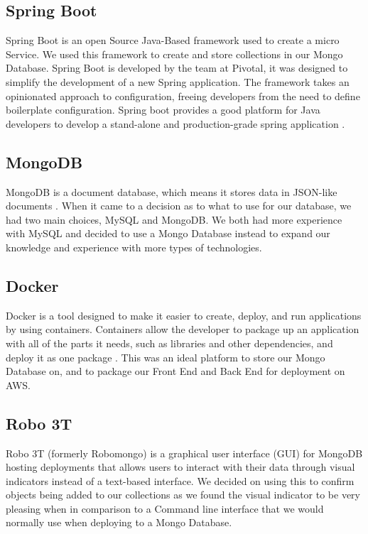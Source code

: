 \subsection{Spring Boot}
Spring Boot is an open Source Java-Based framework used to create a micro Service. We used this framework to create and store collections in our Mongo Database. Spring Boot is developed by the team at Pivotal, it was designed to simplify the development of a new Spring application. The framework takes an opinionated approach to configuration, freeing developers from the need to define boilerplate configuration. Spring boot provides a good platform for Java developers to develop a stand-alone and production-grade spring application \cite{Javapoint}.

\subsection{MongoDB}
MongoDB is a document database, which means it stores data in JSON-like documents \cite{Mongo}. When it came to a decision as to what to use for our database, we had two main choices, MySQL and MongoDB. We both had more experience with MySQL and decided to use a Mongo Database instead to expand our knowledge and experience with more types of technologies.

\subsection{Docker}
Docker is a tool designed to make it easier to create, deploy, and run applications by using containers. Containers allow the developer to package up an application with all of the parts it needs, such as libraries and other dependencies, and deploy it as one package \cite{Docker}. This was an ideal platform to store our Mongo Database on, and to package our Front End and Back End for deployment on AWS.

\subsection{Robo 3T}
Robo 3T (formerly Robomongo) is a graphical user interface (GUI) for MongoDB hosting deployments that allows users to interact with their data through visual indicators instead of a text-based interface. We decided on using this to confirm objects being added to our collections as we found the visual indicator to be very pleasing when in comparison to a Command line interface that we would normally use when deploying to a Mongo Database.

